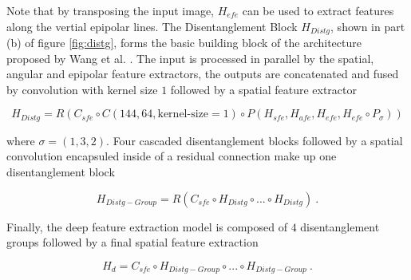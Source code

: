 Note that by transposing the input image, $H_{efe}$ can be used to extract features along the vertial epipolar lines.
The Disentanglement Block $H_{Distg}$, shown in part (b) of figure \ref{fig:distg}, forms the basic building block of the architecture proposed by Wang et al. \cite{wangDisentanglingLightFields2023}.
The input is processed in parallel by the spatial, angular and epipolar feature extractors,
the outputs are concatenated and fused by convolution with kernel size $1$ followed by a spatial feature extractor

\begin{equation}
    \label{eq:distgBlock}
    H_{Distg} = R(C_{sfe} \circ C(144, 64, \text{kernel-size}=1) \circ P(H_{sfe}, H_{afe}, H_{efe}, H_{efe} \circ P_\sigma))
\end{equation}

where $\sigma = (1, 3, 2)$.
Four cascaded disentanglement blocks followed by a spatial convolution encapsuled inside of a residual connection make up one disentanglement block

    $$ H_{Distg-Group} = R(C_{sfe} \circ H_{Distg} \circ ... \circ H_{Distg}) ~.$$

Finally, the deep feature extraction model is composed of $4$ disentanglement groups followed by a final spatial feature extraction

    $$ H_d = C_{sfe} \circ H_{Distg-Group} \circ ... \circ H_{Distg-Group} ~. $$